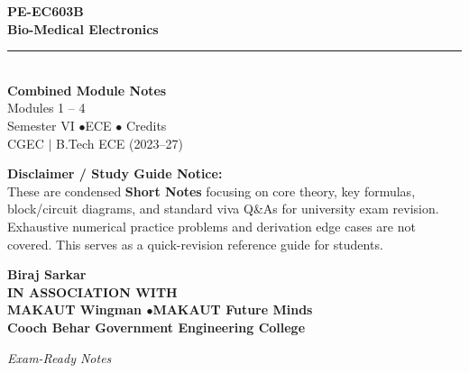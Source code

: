 \documentclass[12pt,a4paper]{article}
\begin{document}
\thispagestyle{empty}


\vspace*{1.0cm}
\begin{center}
  {\Huge\bfseries\color{myred} PE-EC603B}\\[10pt]
  {\LARGE\bfseries\color{mydark} Bio-Medical Electronics}\\[20pt]
  {\color{myred}\rule{0.7\linewidth}{1.5pt}}\\[18pt]
  {\Large\color{myteal}\textbf{Combined Module Notes}}\\[8pt]
  {\large\color{mydark} Modules 1 -- 4}\\[40pt]
  {\normalsize\color{mydark} Semester VI \quad$\bullet$\quad ECE \quad$\bullet$ Credits}\\[12pt]
  {\normalsize\color{mydark} CGEC \;$|$\; B.Tech ECE (2023--27)}
\end{center}
\vspace{1.0cm}
\begin{center}
  \begin{tcolorbox}[colback=mygray, colframe=mgframe, boxrule=0.5pt, arc=3pt, width=0.85\linewidth]
    \centering\small\color{mydark}
    \textbf{Disclaimer / Study Guide Notice:}\\
    These are condensed \textbf{Short Notes} focusing on core theory, key formulas, block/circuit diagrams, and standard viva Q\&As for university exam revision. Exhaustive numerical practice problems and derivation edge cases are not covered. This serves as a quick-revision reference guide for students.
  \end{tcolorbox}
\end{center}
\vfill
\vspace{0.6cm}
\begin{center}
  {\large\bfseries\color{mypurple} Biraj Sarkar}\\[16pt]
  {\footnotesize\color{watermark}\textbf{IN ASSOCIATION WITH}}\\[8pt]
  {\small\bfseries\color{mydark} MAKAUT Wingman \quad$\bullet$\quad MAKAUT Future Minds}\\[12pt]
  {\large\bfseries\color{myteal} Cooch Behar Government Engineering College}
\end{center}
\vfill
\begin{center}{\small\color{watermark}\textit{Exam-Ready Notes}}\end{center}
\clearpage
\end{document}
